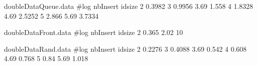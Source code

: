 
\begin{filecontents}{doubleDataQueue.data}
#log nbInsert idsize  
2 0.3982
3 0.9956
3.69 1.558
4 1.8328
4.69 2.5252
5 2.866
5.69 3.7334
\end{filecontents}

\begin{filecontents}{doubleDataFront.data}
#log nbInsert  idsize  
2 0.365
2.02 10
\end{filecontents}

\begin{filecontents}{doubleDataRand.data}
#log nbInsert  idsize  
2 0.2276
3 0.4088
3.69 0.542
4 0.608
4.69 0.768
5 0.84
5.69 1.018
\end{filecontents}
